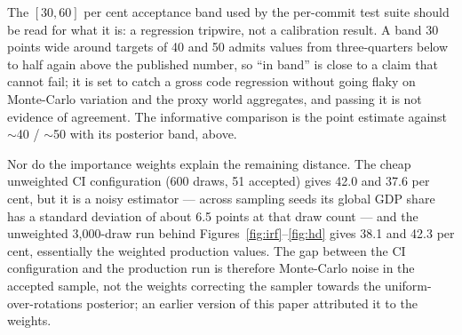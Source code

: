 The $[30, 60]$ per cent acceptance band used by the per-commit test suite should be read for what it is: a regression tripwire, not a calibration result. A band 30 points wide around targets of 40 and 50 admits values from three-quarters below to half again above the published number, so ``in band'' is close to a claim that cannot fail; it is set to catch a gross code regression without going flaky on Monte-Carlo variation and the proxy world aggregates, and passing it is not evidence of agreement. The informative comparison is the point estimate against $\sim$40 / $\sim$50 with its posterior band, above.

Nor do the importance weights explain the remaining distance. The cheap unweighted CI configuration (600 draws, 51 accepted) gives 42.0 and 37.6 per cent, but it is a noisy estimator --- across sampling seeds its global GDP share has a standard deviation of about 6.5 points at that draw count --- and the unweighted 3{,}000-draw run behind Figures~\ref{fig:irf}--\ref{fig:hd} gives 38.1 and 42.3 per cent, essentially the weighted production values. The gap between the CI configuration and the production run is therefore Monte-Carlo noise in the accepted sample, not the weights correcting the \citet{arias2018} sampler towards the uniform-over-rotations posterior; an earlier version of this paper attributed it to the weights.


